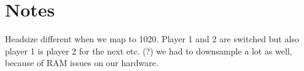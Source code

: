 \documentclass{article}
\theoremstyle{plain}
\theoremstyle{definition}
\theoremstyle{remark}
\begin{document}




\begin{abstract}
lorem ipsum
\end{abstract}

\section{Notes}
Headsize different when we map to 1020.
Player 1 and 2 are switched but also player 1 is player 2 for the next etc. (?)
we had to downsample a lot as well, because of RAM issues on our hardware.
\end{document}
